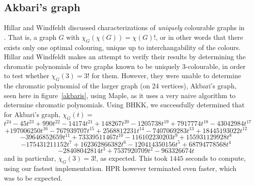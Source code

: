 \documentclass[a4paper]{article}
\begin{document}
\subsection{Akbari's graph}
Hillar and Windfeldt discussed characterizations of \emph{uniquely} colourable graphs in \cite{hillar_windfeldt}. That is, a graph $G$ with $\chi_G(\chi(G)) = \chi(G)!$, or in other words that there exists only one optimal colouring, unique up to interchangability of the colours. Hillar and Windfeldt makes an attempt to verify their results by determining the chromatic polynomials of two graphs known to be uniquely 3-colourable, in order to test whether $\chi_G(3) = 3!$ for them. However, they were unable to determine the chromatic polynomial of the larger graph (on 24 vertices), Akbari's graph, seen here in figure~\ref{akbaris}, using Maple, as it uses a very naive algorithm to determine chromatic polynomials. Using BHKK, we successfully determined that for Akbari's graph, $\chi_G(t) = $
\[
t^{24} - 45t^{23} + 990t^{22} -14174t^{21} + 148267t^{20} - 1205738t^{19} + 7917774t^{18} - 43042984t^{17}
\]
\[
+ 197006250t^{16} - 767939707t^{15} + 2568812231t^{14} - 7407069283t^{13} + 18445193022t^{12}
\]
\[
- 39646852659t^{11} + 73339511467t^{10} - 116102230203t^9 + 155931129928t^8
\]
\[
- 175431211152t^7 + 162362866382t^6 - 120414350156t^5 + 68794778568t^4
\]
\[
- 28408042814t^3 + 7537920709t^2 - 963326674t
\]
and in particular, $\chi_G(3) = 3!$, as expected. This took $1445$ seconds to compute, using our fastest implementation. HPR however terminated even faster, which was to be expected.
\end{document}
